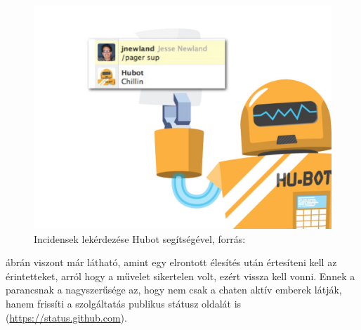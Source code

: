 \begin{figure}[ht]
  \centering
    \includegraphics[scale=1.4]{assets/pager_sup.jpg}%
    \caption[DUMMY]%
    {Incidensek lekérdezése Hubot segítségével, forrás: \cite[p.~83]{what_is_chatops_slideshow}}%
    \label{fig:pager_sup}
\end{figure}

 ábrán viszont már látható, amint egy elrontott élesítés után értesíteni kell az érintetteket, arról hogy a művelet sikertelen volt, ezért vissza kell vonni. Ennek a parancsnak a nagyszerűsége az, hogy nem csak a chaten aktív emberek látják, hanem frissíti a szolgáltatás publikus státusz oldalát is (\url{https://status.github.com}).

